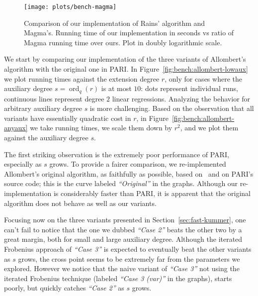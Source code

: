 \documentclass[12pt]{article}
\theoremstyle{plain}
\theoremstyle{definition}
\DeclareMathOperator{\order}{ord} %
\newcounter{algorithm}
\begin{document}
\begin{figure}
  \centering
  \texttt{[image: plots/bench-magma]}
  \caption{Comparison of our implementation of Rains' algorithm and
    Magma's. Running time of our implementation in seconds vs ratio of
    Magma running time over ours. Plot in doubly logarithmic scale.}
  \label{fig:bench:magma}
\end{figure}

We start by comparing our implementation of the three variants of
Allombert's algorithm with the original one in PARI. %
In Figure~\ref{fig:bench:allombert-lowaux} we plot running times
against the extension degree $r$, only for cases where the auxiliary
degree $s=\order_q(r)$ is at most $10$: dots represent individual
runs, continuous lines represent degree $2$ linear regressions. %
Analyzing the behavior for arbitrary auxiliary degree $s$ is more
challenging. %
Based on the observation that all variants have essentially quadratic
cost in $r$, in Figure~\ref{fig:bench:allombert-anyaux} we take
running times, we scale them down by $r^2$, and we plot them against
the auxiliary degree $s$. %

The first striking observation is the extremely poor performance of
PARI, especially as $s$ grows. %
To provide a fairer comparison, we re-implemented Allombert's original
algorithm, as faithfully as possible, based
on~\cite{Allombert02,Allombert02-rev} and on PARI's source code; this
is the curve labeled \emph{``Original''} in the graphs. %
Although our re-implementation is considerably faster than PARI, it is
apparent that the original algorithm does not behave as well as our
variants.

Focusing now on the three variants presented in
Section~\ref{sec:fast-kummer}, one can't fail to notice that the one
we dubbed \emph{``Case 2''} beats the other two by a great margin,
both for small and large auxiliary degree. %
Although the iterated Frobenius approach of \emph{``Case 3''} is
expected to eventually beat the other variants as $s$ grows, the cross
point seems to be extremely far from the parameters we explored. %
However we notice that the naive variant of \emph{``Case 3''} not
using the iterated Frobenius technique (labeled \emph{``Case 3
  (var)''} in the graphs), starts poorly, but quickly catches
\emph{``Case 2''} as $s$ grows.
\end{document}
